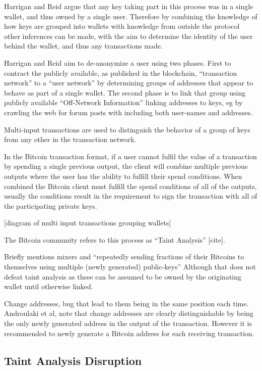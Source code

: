 Harrigan and Reid argue that any key taking part in this process was in a single wallet, and thus owned by a single user. Therefore by combining the knowledge of how keys are grouped into wallets with knowledge from outside the protocol other inferences can be made, with the aim to determine the identity of the user behind the wallet, and thus any transactions made.

Harrigan and Reid aim to de-anonymize a user using two phases.  First to contract the publicly available, as published in the blockchain, “transaction network” to a “user network” by determining groups of addresses that appear to behave as part of a single wallet.  The second phase is to  link that group using publicly available “Off-Network Information” linking addresses to keys, eg by crawling the web for forum posts with including both user-names and addresses.

Multi-input transactions are used to distinguish the behavior of a group of keys from any other in the transaction network.

In the Bitcoin transaction format, if a user cannot fulfil the value of a transaction by spending a single previous output, the client will combine multiple previous outputs where the user has the ability to fulfill their spend conditions.  When combined the Bitcoin client must fulfill the spend conditions of all of the outputs, usually the conditions result in the requirement to sign the transaction with all of the participating private keys.

[diagram of multi input transactions grouping wallets]

The Bitcoin community refers to this process as “Taint Analysis” [cite].

        Briefly mentions mixers and “repeatedly sending fractions of their Bitcoins to themselves using multiple (newly generated) public-keys” Although that does not defeat taint analysis as these can be assumed to be owned by the originating wallet until otherwise linked.

        Change addresses, bug that lead to them being in the same position each time. Androulaki et al, note that change addresses are clearly distinguishable by being the only newly generated address in the output of the transaction. However it is recommended to newly generate a Bitcoin address for each receiving transaction.

\subsection{Taint Analysis Disruption}

